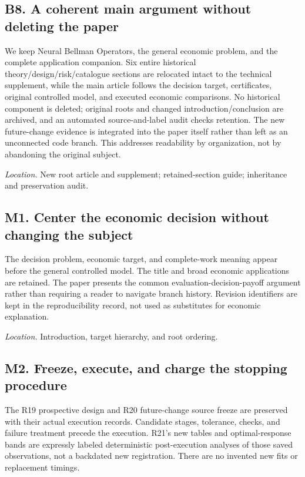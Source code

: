 \documentclass[ecta,nameyear,draft]{econsocart}
\theoremstyle{definition}
\theoremstyle{remark}
\begin{document}
\subsection*{B8. A coherent main argument without deleting the paper}

We keep Neural Bellman Operators, the general economic problem, and the complete application companion. Six entire historical theory/design/risk/catalogue sections are relocated intact to the technical supplement, while the main article follows the decision target, certificates, original controlled model, and executed economic comparisons. No historical component is deleted; original roots and changed introduction/conclusion are archived, and an automated source-and-label audit checks retention. The new future-change evidence is integrated into the paper itself rather than left as an unconnected code branch. This addresses readability by organization, not by abandoning the original subject.


\par\smallskip\noindent\emph{Location.} New root article and supplement; retained-section guide; inheritance and preservation audit.

\subsection*{M1. Center the economic decision without changing the subject}

The decision problem, economic target, and complete-work meaning appear before the general controlled model. The title and broad economic applications are retained. The paper presents the common evaluation-decision-payoff argument rather than requiring a reader to navigate branch history. Revision identifiers are kept in the reproducibility record, not used as substitutes for economic explanation.


\par\smallskip\noindent\emph{Location.} Introduction, target hierarchy, and root ordering.

\subsection*{M2. Freeze, execute, and charge the stopping procedure}

The R19 prospective design and R20 future-change source freeze are preserved with their actual execution records. Candidate stages, tolerance, checks, and failure treatment precede the execution. R21's new tables and optimal-response bands are expressly labeled deterministic post-execution analyses of those saved observations, not a backdated new registration. There are no invented new fits or replacement timings.
\end{document}
